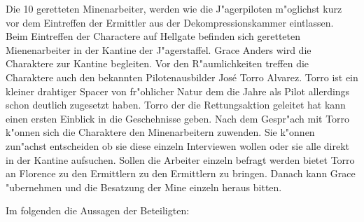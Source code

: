 
Die 10 geretteten Minenarbeiter, werden wie die J"agerpiloten m"oglichst kurz vor dem Eintreffen der Ermittler aus der Dekompressionskammer eintlassen. Beim Eintreffen der Charactere auf Hellgate befinden sich geretteten Mienenarbeiter in der Kantine der J"agerstaffel. Grace Anders wird die Charaktere zur Kantine begleiten. Vor den R"aumlichkeiten treffen die Charaktere auch den bekannten Pilotenausbilder Jos\'{e} \frqq{}Torro\flqq{} Alvarez. Torro ist ein kleiner drahtiger Spacer von fr"ohlicher Natur dem die Jahre als Pilot allerdings schon deutlich zugesetzt haben. Torro der die Rettungsaktion geleitet hat kann einen ersten Einblick in die Geschehnisse geben. Nach dem Gespr"ach mit Torro k"onnen sich die Charaktere den Minenarbeitern zuwenden. Sie k"onnen zun"achst entscheiden ob sie diese einzeln Interviewen wollen oder sie alle direkt in der Kantine aufsuchen. Sollen die Arbeiter einzeln befragt werden bietet Torro an Florence zu den Ermittlern zu den Ermittlern zu bringen. Danach kann Grace "ubernehmen und die Besatzung der Mine einzeln heraus bitten.

Im folgenden die Aussagen der Beteiligten:

